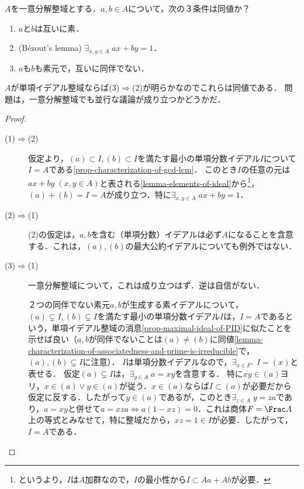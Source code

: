 \documentclass[uplatex,dvipdfmx]{jsreport}
\begin{document}
\begin{proposition}[互いに素の特徴付け？]\label{prop-characterization-of-coprime-in-UFD}
    $A$を一意分解整域とする．$a,b\in A$について，次の３条件は同値か？
    \begin{enumerate}
        \item $a$と$b$は互いに素．
        \item (Bézout's lemma) $\exists_{x,y\in A}\;ax+by=1$．
        \item $a$も$b$も素元で，互いに同伴でない．
    \end{enumerate}
    $A$が単項イデアル整域ならば(3)$\Rightarrow$(2)が明らかなのでこれらは同値である．
    問題は，一意分解整域でも並行な議論が成り立つかどうかだ．
\end{proposition}
\begin{proof}\mbox{}
    \begin{description}
        \item[(1)$\Rightarrow$(2)] 仮定より，$(a)\subset I,(b)\subset I$を満たす最小の単項分数イデアル$I$について$I=A$である\ref{prop-characterization-of-gcd-lcm}．
        このとき$I$の任意の元は$ax+by\;(x,y\in A)$と表される\ref{lemma-elements-of-ideal}から\footnote{というより，$I$は$A$加群なので，$I$の最小性から$I\subset Aa+Ab$が必要．}，
        $(a)+(b)=I=A$が成り立つ．特に$\exists_{x,y\in A}\;ax+by=1$．
        \item[(2)$\Rightarrow$(1)]
        (2)の仮定は，$a,b$を含む（単項分数）イデアルは必ず$A$になることを含意する．これは，$(a),(b)$の最大公約イデアルについても例外ではない．
        \item[(3)$\Rightarrow$(1)] 一意分解整域について，これは成り立つはず．逆は自信がない．

        ２つの同伴でない素元$a,b$が生成する素イデアルについて，$(a)\subsetneq I,(b)\subsetneq I$を満たす最小の単項分数イデアル$I$は，$I=A$であるという，単項イデアル整域の消息\ref{prop-maximal-ideal-of-PID}に似たことを示せば良い（$a,b$が同伴でないことは$(a)\ne (b)$に同値\ref{lemma-characterization-of-associatedness-and-prime-is-irreducible}で，$(a),(b)\subsetneq I$に注意）．
        $I$は単項分数イデアルなので，$\exists_{x\in F^\times}\;I=(x)$と表せる．
        仮定$(a)\subsetneq I$は，$\exists_{y\in A}\;a=xy$を含意する．
        特に$xy\in (a)$ヨリ，$x\in (a)\lor y\in (a)$が従う．$x\in (a)$ならば$I\subset (a)$が必要だから仮定に反する．したがって$y\in (a)$であるが，このとき$\exists_{z\in A}\;y=za$であり，$a=xy$と併せて$a=xza\Leftrightarrow a(1-xz)=0$．これは商体$F=\Frac A$上の等式とみなせて，特に整域だから，$xz=1\in I$が必要．したがって，$I=A$である．
    \end{description}
\end{proof}
\end{document}
